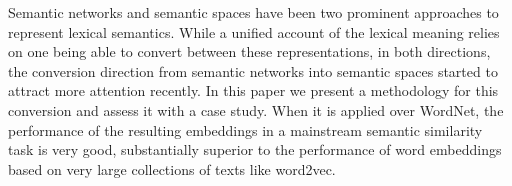 Semantic networks and semantic spaces have been two prominent approaches to represent lexical semantics. While a unified account of the lexical meaning relies on one being able to convert between these representations, in both directions, the conversion direction from semantic networks into semantic spaces started to attract more attention recently. In this paper we present a methodology for this conversion and assess it with a case study. When it is applied over WordNet, the performance of the resulting embeddings in a mainstream semantic similarity task is very good, substantially superior to the performance of word embeddings based on very large collections of texts like word2vec.
